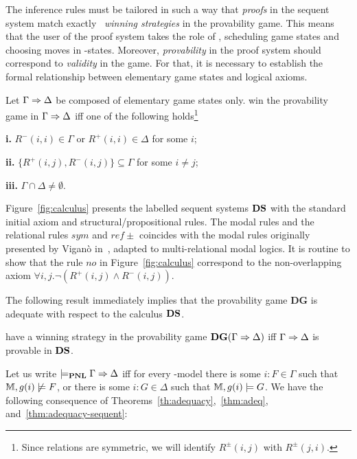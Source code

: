 The inference rules must be tailored in such a way that {\em
proofs} in the sequent system match exactly \My\  {\em winning strategies} in
the provability game. This means that the user of the proof system takes the
role of \Me, scheduling game states and choosing moves in \I-states. 
Moreover, {\em provability} in the proof system should correspond to {\em
validity} in the game. For that,  it is necessary to establish the
formal relationship between elementary game states and logical axioms.


\begin{lemma}\label{lemma:init}
    Let $\Gamma\Rightarrow \Delta$ be composed of elementary game states only. \Ic win the provability game in $\Gamma \Rightarrow \Delta$ iff one of the following holds\footnote{\label{foot:sym}Since relations are symmetric, we will identify $R^\pm(i,j)$ with  $R^\pm(j,i)$.} 
    
    \noindent\textbf{i.} $R^-(i,i)\in\Gamma$ or $R^+(i,i)\in\Delta$ for some $i$;

    \noindent\textbf{ii.} $\{R^+(i,j),R^-(i,j)\}\subseteq\Gamma$ for some $i\not=j$;

    \noindent\textbf{iii.} $\Gamma\cap\Delta\not=\emptyset$.
\end{lemma}
Figure~\ref{fig:calculus} presents the labelled sequent systems $\mathbf{DS}$ with the standard initial axiom and structural/propositional  rules. The modal  rules and the relational rules $sym$ and  $ref\pm$  coincides with the modal rules originally presented by Vigan\`{o} in~\cite{Vigano:2000}, adapted to multi-relational modal logics. 
%
It is routine to show that the rule $no$ in Figure~\ref{fig:calculus} correspond to the non-overlapping  axiom
$
\forall i,j. \neg(R^+(i,j)\wedge R^-(i,j)) 
$.

The following result immediately implies that the provability game $\mathbf{DG}$ is adequate with respect to the calculus $\mathbf{DS}$.

\begin{theorem}\label{thm:adequacy-sequent}
\Ic have a winning strategy in the provability game $\mathbf{DG}(\Gamma\Rightarrow\Delta)$  iff $\Gamma\Rightarrow\Delta$ is provable in $\mathbf{DS}$. 
\end{theorem}

Let us write $\models_{\textbf{PNL}} \Gamma \Rightarrow \Delta$ iff for every \PNL-model there is some $i:F \in \Gamma$ such that $\M,\g(i)\not\models F$, or there is some $i:G \in \Delta$ such that $\M,\g(i)\models G$. We have the following consequence of Theorems~\ref{th:adequacy},~\ref{thm:adeq}, and~\ref{thm:adequacy-sequent}: 

